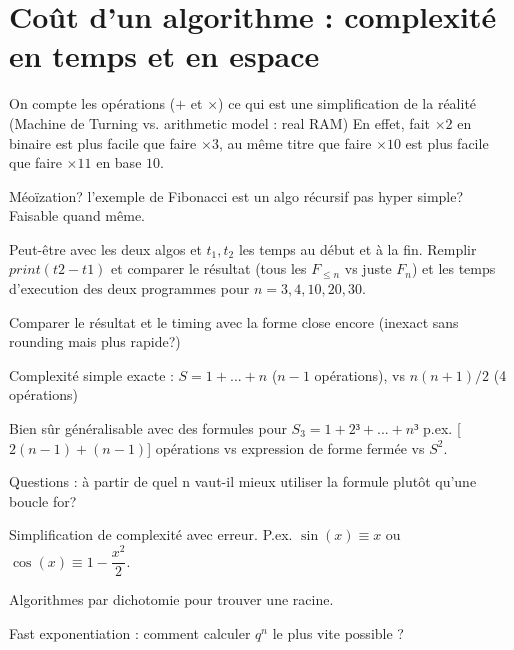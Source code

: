 \section{Coût d'un algorithme : complexité en temps et en espace}

On compte les opérations ($+$ et $\times$) ce qui est une simplification de la réalité (Machine de Turning vs. arithmetic model : real RAM)
En effet, fait $\times 2$ en binaire est plus facile que faire $\times3$, au même titre que faire $\times10$ est plus facile que faire $\times11$ en base $10$.

Méoïzation? l'exemple de Fibonacci est un algo récursif pas hyper simple? Faisable quand même.

Peut-être avec les deux algos et $t_1, t_2$ les temps au début et à la fin. Remplir $print(t2-t1)$ et comparer le résultat (tous les $F_{\leq n}$ vs juste $F_n$) et les temps d'execution des deux programmes pour $n=3, 4, 10, 20, 30$.

Comparer le résultat et le timing avec la forme close encore (inexact sans rounding mais plus rapide?)

Complexité simple exacte : $S = 1 + ... + n$ ($n-1$ opérations), vs $n(n+1)/2$ (4 opérations)

Bien sûr généralisable avec des formules pour $S_3 = 1+2³+...+n³$ p.ex. [$2(n-1) + (n-1)$] opérations vs expression de forme fermée vs $S^2$.

Questions : à partir de quel n vaut-il mieux utiliser la formule plutôt qu'une boucle for?

Simplification de complexité avec erreur. P.ex. $\sin(x) \equiv x$ ou $\cos(x) \equiv 1 - \dfrac{x^2}2$.

Algorithmes par dichotomie pour trouver une racine.

Fast exponentiation : comment calculer $q^n$ le plus vite possible ?


